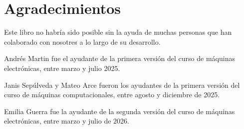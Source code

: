 \documentclass[../principal.tex]{subfiles}
\begin{document}

\section{Agradecimientos}

Este libro no habría sido posible sin la ayuda de muchas personas que han colaborado con nosotres a lo largo de su desarrollo.

Andrés Martin fue el ayudante de la primera versión del curso de máquinas electrónicas, entre marzo y julio 2025.

Janis Sepúlveda y Mateo Arce fueron los ayudantes de la primera versión del curso de máquinas computacionales, entre agosto y diciembre de 2025.

Emilia Guerra fue la ayudante de la segunda versión del curso de máquinas electrónicas, entre marzo y julio de 2026.

\newpage
\end{document}
